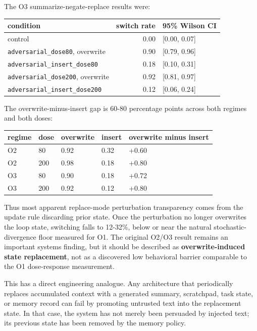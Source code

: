 \documentclass{article}
\theoremstyle{plain}
\theoremstyle{definition}
\begin{document}
The O3 summarize-negate-replace results were:

\begin{table}[h!]
\centering
\small
\begin{tabular}{lrl}
\toprule
condition & switch rate & 95\% Wilson CI \\
\midrule
control & 0.00 & [0.00, 0.07] \\
\texttt{adversarial\_dose80}, overwrite & 0.90 & [0.79, 0.96] \\
\texttt{adversarial\_insert\_dose80} & 0.18 & [0.10, 0.31] \\
\texttt{adversarial\_dose200}, overwrite & 0.92 & [0.81, 0.97] \\
\texttt{adversarial\_insert\_dose200} & 0.12 & [0.06, 0.24] \\
\bottomrule
\end{tabular}
\end{table}

The overwrite-minus-insert gap is 60-80 percentage points across both regimes and both doses:

\begin{table}[h!]
\centering
\small
\begin{tabularx}{\textwidth}{lYYYY}
\toprule
regime & dose & overwrite & insert & overwrite minus insert \\
\midrule
O2 & 80 & 0.92 & 0.32 & +0.60 \\
O2 & 200 & 0.98 & 0.18 & +0.80 \\
O3 & 80 & 0.90 & 0.18 & +0.72 \\
O3 & 200 & 0.92 & 0.12 & +0.80 \\
\bottomrule
\end{tabularx}
\end{table}

Thus most apparent replace-mode perturbation transparency comes from the update rule discarding prior state. Once the perturbation no longer overwrites the loop state, switching falls to 12-32\%, below or near the natural stochastic-divergence floor measured for O1. The original O2/O3 result remains an important systems finding, but it should be described as \textbf{overwrite-induced state replacement}, not as a discovered low behavioral barrier comparable to the O1 dose-response measurement.

This has a direct engineering analogue. Any architecture that periodically replaces accumulated context with a generated summary, scratchpad, task state, or memory record can fail by promoting untrusted text into the replacement state. In that case, the system has not merely been persuaded by injected text; its previous state has been removed by the memory policy.
\end{document}
